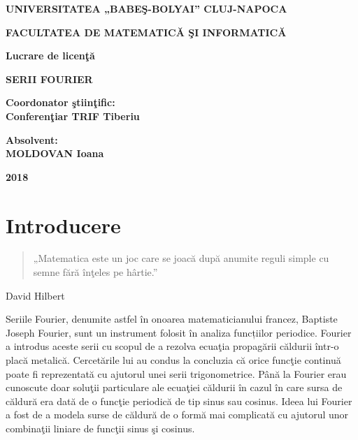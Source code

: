\documentclass[a4paper,openany,12pt]{report}
\begin{document}
\begin{center}
	{\large \textbf{UNIVERSITATEA „BABE\c S-BOLYAI” CLUJ-NAPOCA}} \vspace{3mm} %
	
	{\large \textbf{FACULTATEA DE MATEMATIC\u A \c SI INFORMATIC\u A}} \vspace{4cm}

	{\Large \textbf{Lucrare de licen\c t\u a}} \vspace{2cm}

	{\Large \textbf{SERII FOURIER}} \vspace{4cm}
\end{center}
\begin{flushleft}{\large \textbf{Coordonator \c stiin\c tific:\\Conferen\c tiar TRIF Tiberiu}}
\end{flushleft}
\begin{flushright}{\large \textbf{Absolvent:\\ MOLDOVAN Ioana}} \vspace{3cm}
\end{flushright}
\begin{center}
{\large \textbf{2018}}
\end{center}

\newpage
\tableofcontents
{}\chapter*{Introducere}
\begin{quote}
„Matematica este un joc care se joac\u a dup\u a anumite reguli simple cu semne f\u ar\u a \^ in\c teles pe h\^ artie.”
\end{quote}
\begin{flushright} David Hilbert
\end{flushright}



Seriile Fourier, denumite astfel \^ in onoarea matematicianului francez, Baptiste Joseph Fourier, sunt un instrument folosit \^ in analiza funcțiilor periodice. Fourier a introdus aceste serii cu scopul de a rezolva ecua\c tia propag\u arii c\u aldurii \^ intr-o plac\u a metalic\u a. Cercet\u arile lui au condus la concluzia c\u a orice func\c tie continu\u a poate fi reprezentat\u a cu ajutorul unei serii trigonometrice. P\^ an\u a la Fourier erau cunoscute doar solu\c tii particulare ale ecua\c tiei c\u aldurii \^ in cazul \^ in care sursa de c\u aldur\u a era dat\u a de o func\c tie periodic\u a de tip sinus sau cosinus. Ideea lui Fourier a fost de a modela surse de c\u aldur\u a de o form\u a mai complicat\u a cu ajutorul unor combina\c tii liniare de func\c tii sinus \c si cosinus.
\end{document}
